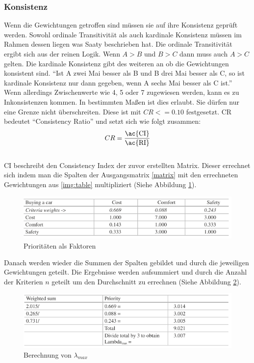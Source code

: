 \subsubsection{Konsistenz}
Wenn die Gewichtungen getroffen sind müssen sie auf ihre Konsistenz geprüft werden.\autocite[Vgl.][S.13]{Mu.2018} Sowohl ordinale Transitivität als auch kardinale Konsistenz müssen im Rahmen dessen liegen was Saaty beschrieben hat.\autocite[Vgl.][S.107]{Fink.2006} Die ordinale Transitivität ergibt sich aus der reinen Logik. Wenn $A > B$ und $B > C$ dann muss auch $A > C$ gelten.\autocite[Vgl.][S.108]{Fink.2006} Die kardinale Konsistenz gibt des weiteren an ob die Gewichtungen konsistent sind. \enquote{Ist A zwei Mai besser als B und B drei Mai besser als C, so ist kardinale Konsistenz nur dann gegeben, wenn A sechs Mai besser als C ist.}\autocite[S.107]{Fink.2006} Wenn allerdings Zwischenwerte wie 4, 5 oder 7 zugewiesen werden, kann es zu Inkonsistenzen kommen. In bestimmten Maßen ist dies erlaubt. Sie dürfen nur eine Grenze nicht überschreiten.\autocite[Vgl.][S.13]{Mu.2018} Diese ist mit $CR<=0.10$ festgesetzt. CR bedeutet \enquote{Consistency Ratio} und setzt sich wie folgt zusammen:\autocite[Vgl.][S.13]{Mu.2018}\\
\[CR=\frac{\mbox{\ac{CI}}}{\mbox{\ac{RI}}}\]\\
\ac{CI} beschreibt den Consistency Index der zuvor erstellten Matrix. Dieser errechnet sich indem man die Spalten der Ausgangsmatrix \ref{matrix} mit den errechneten Gewichtungen aus \ref{img:table} multipliziert (Siehe Abbildung \ref{img:crit}).
\begin{figure}[h!]
	\centering
	\includegraphics[scale = 1]{img/Kriterien.png}
	\caption{Prioritäten als Faktoren}
	\label{img:crit}
\end{figure}
Danach werden wieder die Summen der Spalten gebildet und durch die jeweiligen Gewichtungen geteilt. Die Ergebnisse werden aufsummiert und durch die Anzahl der Kriterien $n$ geteilt um den Durchschnitt zu errechnen (Siehe Abbildung \ref{img:lambda}). \\
\begin{figure}[h!]
	\centering
	\includegraphics[scale = 0.9]{img/Lambda.png}
	\caption{Berechnung von $\lambda_{max}$}
	\label{img:lambda}
\end{figure} 
